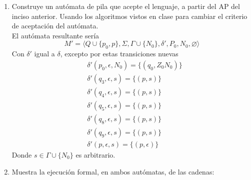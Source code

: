 \documentclass{article}
\begin{document}
\begin{enumerate}
{\begin{enumerate}
{	        \begin{itemize}
	        	\item {
	        		$Q = \{q_0\} \cup Q_1 \cup Q_2$
	        	}

	        	\item {
	        		$\Sigma = \{a, b, c\}$
	        	}
	        	\item {
	        		$\Gamma = \{A, B, Z_0\}$
	        	}
	        	\item {
	        		\begin{align*}
						\delta (q_0, \epsilon, Z_0) &= \{(q_0, Z_0), (q_6, Z_0)\} \\
						\delta (p, s, \gamma) &=
						\begin{cases}
							&\delta_1(p, s, \gamma) \text{ si } p \in Q_1 \\
							&\delta_2(p, s, \gamma) \text{ si } p \in Q_2 \\
						\end{cases}
					\end{align*}
	        	}
	        	\item {
	        		$q_0$ es el estado inicial.
	        	}
	        	\item {
	        		$Z_0$ es el símbolo al fondo de la pila.
	        	}
	        	\item {
	        		$F = F_1 \cup F_2$
	        	}
	        \end{itemize}
	        }
        	\item{
            Construye un autómata de pila que acepte el lenguaje, a partir del
            AP del inciso anterior. Usando los algoritmos vistos en clase para
            cambiar el criterio de aceptación del autómata.\\
            El autómata resultante sería
            \[M' = \langle Q \cup \{p_0, p\} , \Sigma, \Gamma \cup \{N_0\} , \delta', P_0 , N_0, \varnothing \rangle\]
            Con $\delta'$ igual a $\delta$, excepto por estas transiciones nuevas
            \begin{align*}
            	&\delta'(p_0, \epsilon, N_0) = \{(q_0, Z_0N_0)\}\\
				&\delta'(q_3, \epsilon, s) = \{(p, s)\} \\
				&\delta'(q_4, \epsilon, s) = \{(p, s)\} \\
				&\delta'(q_5, \epsilon, s) = \{(p, s)\} \\
				&\delta'(q_8, \epsilon, s) = \{(p, s)\} \\
				&\delta'(q_9, \epsilon, s) = \{(p, s)\} \\
            	&\delta'(p, \epsilon, s) = \{(p,\epsilon)\}
			\end{align*}
			Donde $s\in \Gamma \cup \{N_0\}$ es arbitrario.
           }
        	\item{
        	Muestra la ejecución formal, en ambos autómatas, de las cadenas:

}
\end{enumerate}}
\end{enumerate}
\end{document}
